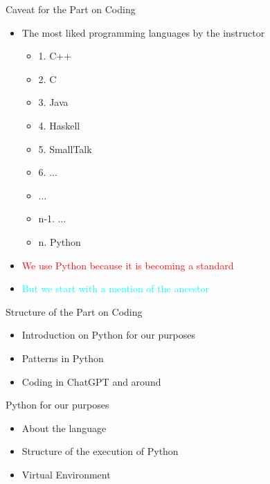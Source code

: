 \documentclass{beamer}
\begin{document}
\begin{frame}
{\centerline{Caveat for the Part on Coding}}
\begin{itemize}
    \item The most liked programming languages by the instructor
    \begin{itemize}
    \item 1. C++
    \item 2. C
    \item 3. Java
    \item 4. Haskell
    \item 5. SmallTalk
    \item 6. $\ldots{}$
    \item $\ldots{}$
    \item n-1. $\ldots{}$\\\vspace{0.3 cm}
    \item n. \tiny{Python}
    \end{itemize} 
    \item \textcolor{red}{We use Python because it is becoming a standard}
    \item \textcolor{cyan}{But we start with a mention of the ancestor}
\end{itemize} 
\end{frame}



\begin{frame}
{\centerline{Structure of the Part on Coding}}
\begin{itemize}
    \item Introduction on Python for our purposes
    \item Patterns in Python
    \item Coding in ChatGPT and around
\end{itemize} 
\end{frame}

\begin{frame}
{\centerline{Python for our purposes}}
\begin{itemize}
    \item About the language
    \item Structure of the execution of Python
    \item Virtual Environment
\end{itemize} 
\end{frame}
\end{document}
